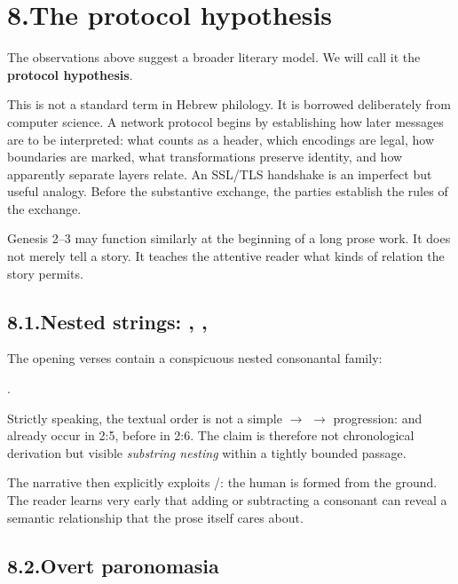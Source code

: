 \section*{8.\quad The protocol hypothesis}

The observations above suggest a broader literary model.  We will call it the \textbf{protocol hypothesis}.

This is not a standard term in Hebrew philology.  It is borrowed deliberately from computer science.  A network protocol begins by establishing how later messages are to be interpreted: what counts as a header, which encodings are legal, how boundaries are marked, what transformations preserve identity, and how apparently separate layers relate.  An SSL/TLS handshake is an imperfect but useful analogy.  Before the substantive exchange, the parties establish the rules of the exchange.

Genesis 2--3 may function similarly at the beginning of a long prose work.  It does not merely tell a story.  It teaches the attentive reader what kinds of relation the story permits.

\subsection*{8.1.\quad Nested strings: , , }

The opening verses contain a conspicuous nested consonantal family:

\begin{center}
 \qquad {} \qquad {}.
\end{center}

Strictly speaking, the textual order is not a simple  $\rightarrow$  $\rightarrow$  progression:  and  already occur in 2:5, before  in 2:6.  The claim is therefore not chronological derivation but visible \emph{substring nesting} within a tightly bounded passage.

The narrative then explicitly exploits /: the human is formed from the ground.  The reader learns very early that adding or subtracting a consonant can reveal a semantic relationship that the prose itself cares about.

\subsection*{8.2.\quad Overt paronomasia}

